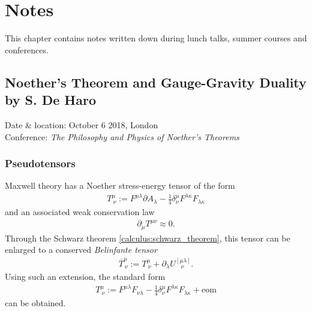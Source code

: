 \chapter{Notes}

    This chapter contains notes written down during lunch talks, summer courses and conferences.

\section{Noether's Theorem and Gauge-Gravity Duality by S. De Haro}

    Date \& location: October 6 2018, London\\
    Conference: \textit{The Philosophy and Physics of Noether's Theorems}

\subsection{Pseudotensors}

    Maxwell theory has a Noether stress-energy tensor of the form
    \begin{gather}
        T^\mu_{\ \nu} := F^{\mu\lambda}\partial A_\lambda - \frac{1}{4}\delta^\mu_\nu F^{\lambda\kappa}F_{\lambda\kappa}
    \end{gather}
    and an associated weak conservation law
    \begin{gather}
        \partial_\mu T^{\mu\nu}\approx 0.
    \end{gather}
    Through the Schwarz theorem \ref{calculus:schwarz_theorem}, this tensor can be enlarged to a conserved \textit{Belinfante tensor}
    \begin{gather}
        \overline{T}^\mu_{\ \nu} := T^\mu_{\ \nu} + \partial_\lambda U^{[\mu\lambda]}_{\ \ \ \ \nu}.
    \end{gather}
    Using such an extension, the standard form
    \begin{gather}
        T^\mu_{\ \nu} := F^{\mu\lambda}F_{\nu\lambda} - \frac{1}{4}\delta^\mu_\nu F^{\lambda\kappa}F_{\lambda\kappa} + \text{eom}
    \end{gather}
    can be obtained.

